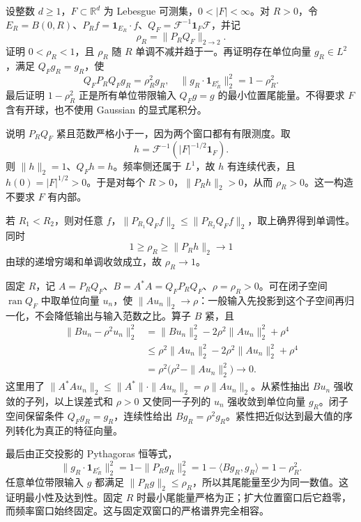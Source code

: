 \begin{optionalexercise}\label{b2:ex:20-new-8}
设整数 \(d\geq1\)，\(F\subset\mathbb R^d\) 为 Lebesgue 可测集，\(0<|F|<\infty\)。对 \(R>0\)，令 \(E_R=B(0,R)\)、\(P_Rf=\mathbf1_{E_R}\cdot f\)、\(Q_F=\mathcal F^{-1}\mathbf1_F\mathcal F\)，并记
\[
 \rho_R=\|P_RQ_F\|_{2\to2}.
\]
证明 \(0<\rho_R<1\)，且 \(\rho_R\) 随 \(R\) 单调不减并趋于一。再证明存在单位向量 \(g_R\in L^2\)，满足 \(Q_Fg_R=g_R\)，使
\[
 Q_FP_RQ_Fg_R=\rho_R^2g_R,
 \quad
 \|g_R\cdot\mathbf1_{E_R^c}\|_2^2=1-\rho_R^2.
\]
最后证明 \(1-\rho_R^2\) 正是所有单位带限输入 \(Q_Fg=g\) 的最小位置尾能量。不得要求 \(F\) 含有开球，也不使用 Gaussian 的显式尾积分。
\end{optionalexercise}
\begin{solution}
说明 \(P_RQ_F\) 紧且范数严格小于一，因为两个窗口都有有限测度。取
\[
 h=\mathcal F^{-1}\left(|F|^{-1/2}\mathbf1_F\right).
\]
则 \(\|h\|_2=1\)、\(Q_Fh=h\)。频率侧还属于 \(L^1\)，故 \(h\) 有连续代表，且 \(h(0)=|F|^{1/2}>0\)。于是对每个 \(R>0\)，\(\|P_Rh\|_2>0\)，从而 \(\rho_R>0\)。这一构造不要求 \(F\) 有内部。

若 \(R_1<R_2\)，则对任意 \(f\)，\(\|P_{R_1}Q_Ff\|_2\leq\|P_{R_2}Q_Ff\|_2\)，取上确界得到单调性。同时
\[
 1\geq\rho_R\geq\|P_Rh\|_2\longrightarrow1
\]
由球的递增穷竭和单调收敛成立，故 \(\rho_R\to1\)。

固定 \(R\)，记 \(A=P_RQ_F\)、\(B=A^*A=Q_FP_RQ_F\)、\(\rho=\rho_R>0\)。可在闭子空间 \(\operatorname{ran}Q_F\) 中取单位向量 \(u_n\)，使 \(\|Au_n\|_2\to\rho\)：一般输入先投影到这个子空间再归一化，不会降低输出与输入范数之比。算子 \(B\) 紧，且
\[
 \begin{aligned}
 \|Bu_n-\rho^2u_n\|_2^2
 &=\|Bu_n\|_2^2-2\rho^2\|Au_n\|_2^2+\rho^4\\
 &\leq\rho^2\|Au_n\|_2^2
              -2\rho^2\|Au_n\|_2^2+\rho^4\\
 &=\rho^2\bigl(\rho^2-\|Au_n\|_2^2\bigr)\longrightarrow0.
 \end{aligned}
\]
这里用了 \(\|A^*Au_n\|_2\leq\|A^*\|\cdot\|Au_n\|_2=\rho\|Au_n\|_2\)。从紧性抽出 \(Bu_n\) 强收敛的子列，以上误差式和 \(\rho>0\) 又使同一子列的 \(u_n\) 强收敛到单位向量 \(g_R\)。闭子空间保留条件 \(Q_Fg_R=g_R\)，连续性给出 \(Bg_R=\rho^2g_R\)。紧性把近似达到最大值的序列转化为真正的特征向量。

最后由正交投影的 Pythagoras 恒等式，
\[
 \|g_R\cdot\mathbf1_{E_R^c}\|_2^2
 =1-\|P_Rg_R\|_2^2
 =1-\langle Bg_R,g_R\rangle
 =1-\rho_R^2.
\]
任意单位带限输入 \(g\) 都满足 \(\|P_Rg\|_2\leq\rho_R\)，所以其尾能量至少为同一数值。这证明最小性及达到性。固定 \(R\) 时最小尾能量严格为正；扩大位置窗口后它趋零，而频率窗口始终固定。这与固定双窗口的严格谱界完全相容。
\end{solution}
